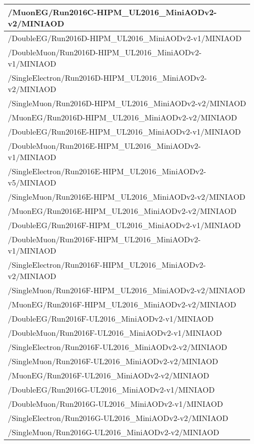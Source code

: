 \begin{table}[h]
\begin{tabular}{l}
        /MuonEG/Run2016C-HIPM\_UL2016\_MiniAODv2-v2/MINIAOD	\\
        \hline
        /DoubleEG/Run2016D-HIPM\_UL2016\_MiniAODv2-v1/MINIAOD \\
        /DoubleMuon/Run2016D-HIPM\_UL2016\_MiniAODv2-v1/MINIAOD	\\
        /SingleElectron/Run2016D-HIPM\_UL2016\_MiniAODv2-v2/MINIAOD	\\
        /SingleMuon/Run2016D-HIPM\_UL2016\_MiniAODv2-v2/MINIAOD	\\
        /MuonEG/Run2016D-HIPM\_UL2016\_MiniAODv2-v2/MINIAOD	\\
        \hline
        /DoubleEG/Run2016E-HIPM\_UL2016\_MiniAODv2-v1/MINIAOD \\
        /DoubleMuon/Run2016E-HIPM\_UL2016\_MiniAODv2-v1/MINIAOD	\\
        /SingleElectron/Run2016E-HIPM\_UL2016\_MiniAODv2-v5/MINIAOD	\\
        /SingleMuon/Run2016E-HIPM\_UL2016\_MiniAODv2-v2/MINIAOD	\\
        /MuonEG/Run2016E-HIPM\_UL2016\_MiniAODv2-v2/MINIAOD	\\
        \hline
        /DoubleEG/Run2016F-HIPM\_UL2016\_MiniAODv2-v1/MINIAOD \\
        /DoubleMuon/Run2016F-HIPM\_UL2016\_MiniAODv2-v1/MINIAOD	\\
        /SingleElectron/Run2016F-HIPM\_UL2016\_MiniAODv2-v2/MINIAOD	\\
        /SingleMuon/Run2016F-HIPM\_UL2016\_MiniAODv2-v2/MINIAOD	\\
        /MuonEG/Run2016F-HIPM\_UL2016\_MiniAODv2-v2/MINIAOD	\\
        \hline
        /DoubleEG/Run2016F-UL2016\_MiniAODv2-v1/MINIAOD \\
        /DoubleMuon/Run2016F-UL2016\_MiniAODv2-v1/MINIAOD	\\
        /SingleElectron/Run2016F-UL2016\_MiniAODv2-v2/MINIAOD	\\
        /SingleMuon/Run2016F-UL2016\_MiniAODv2-v2/MINIAOD	\\
        /MuonEG/Run2016F-UL2016\_MiniAODv2-v2/MINIAOD	\\
        \hline
        /DoubleEG/Run2016G-UL2016\_MiniAODv2-v1/MINIAOD \\
        /DoubleMuon/Run2016G-UL2016\_MiniAODv2-v1/MINIAOD	\\
        /SingleElectron/Run2016G-UL2016\_MiniAODv2-v2/MINIAOD	\\
        /SingleMuon/Run2016G-UL2016\_MiniAODv2-v2/MINIAOD	\\

\end{tabular}
\end{table}

